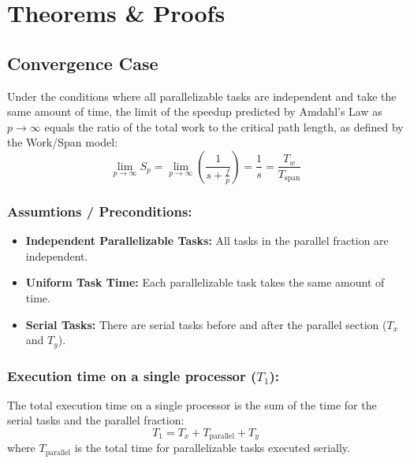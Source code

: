 \documentclass[
  a4paper, %
]{kaohandt}
\begin{document}
\section{Theorems \& Proofs}

\subsection{Convergence Case}

\begin{theorem}
  Under the conditions where all parallelizable tasks are independent and take the same amount of time, the limit of the speedup predicted by Amdahl's Law as $p \rightarrow \infty$ equals the ratio of the total work to the critical path length, as defined by the Work/Span model:
  \begin{equation}
    \lim_{p \to \infty} S_p = \lim_{p \to \infty} \left(\frac{1}{s + \frac{f}{p}}\right) = \frac{1}{s} = \frac{T_w}{T_{\text{span}}}
  \end{equation}
\end{theorem}

\subsubsection*{Assumtions / Preconditions:}
\begin{itemize}
  \item \textbf{Independent Parallelizable Tasks:} All tasks in the parallel fraction are independent.
  \item \textbf{Uniform Task Time:} Each parallelizable task takes the same amount of time.
  \item \textbf{Serial Tasks:} There are serial tasks before and after the parallel section ($T_x$ and $T_y$).
\end{itemize}

\widelayout

\subsubsection*{Execution time on a single processor ($T_1$):}
The total execution time on a single processor is the sum of the time for the serial tasks and the parallel fraction:
\begin{equation}
  T_1 = T_x + T_{\text{parallel}} + T_y
\end{equation}
where $T_{\text{parallel}}$ is the total time for parallelizable tasks executed serially.
\end{document}
